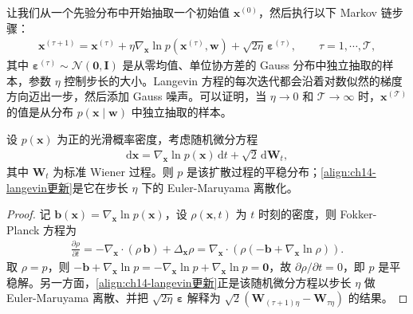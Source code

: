 \documentclass[../../main.tex]{subfiles}
\begin{document}
让我们从一个先验分布中开始抽取一个初始值 $\bm{x}^{(0)}$，然后执行以下 Markov 链步骤：
\begin{align}
\bm{x}^{(\tau+1)}=\bm{x}^{(\tau)}+\eta\nabla_{\bm{x}}\ln p\!\left(\bm{x}^{(\tau)},\bm{w}\right)+\sqrt{2\eta}\,\bm{\varepsilon}^{(\tau)},\qquad \tau=1,\cdots,\mathcal{T},
\label{align:ch14-langevin更新}
\end{align}
其中 $\bm{\varepsilon}^{(\tau)}\sim\mathcal{N}(\bm{0},\bm{I})$ 是从零均值、单位协方差的 Gauss 分布中独立抽取的样本，参数 $\eta$ 控制步长的大小。Langevin 方程的每次迭代都会沿着对数似然的梯度方向迈出一步，然后添加 Gauss 噪声。可以证明，当 $\eta\rightarrow0$ 和 $\mathcal{T}\rightarrow\infty$ 时，$\bm{x}^{(\mathcal{T})}$ 的值是从分布 $p(\bm{x}\mid\bm{w})$ 中独立抽取的样本。

\begin{proposition}\label{proposition:ch14-langevin平稳}
设 $p(\bm{x})$ 为正的光滑概率密度，考虑随机微分方程
\begin{align*}
\mathrm{d}\bm{x}=\nabla_{\bm{x}}\ln p(\bm{x})\,\mathrm{d}t+\sqrt{2}\,\mathrm{d}\bm{W}_{t},
\end{align*}
其中 $\bm{W}_{t}$ 为标准 Wiener 过程。则 $p$ 是该扩散过程的平稳分布；\eqref{align:ch14-langevin更新}是它在步长 $\eta$ 下的 Euler-Maruyama 离散化。
\end{proposition}

\begin{proof}
记 $\bm{b}(\bm{x})=\nabla_{\bm{x}}\ln p(\bm{x})$，设 $\rho(\bm{x},t)$ 为 $t$ 时刻的密度，则 Fokker-Planck 方程为
\begin{align*}
\frac{\partial\rho}{\partial t}=-\nabla_{\bm{x}}\cdot\left(\rho\,\bm{b}\right)+\Delta_{\bm{x}}\rho=\nabla_{\bm{x}}\cdot\left(\rho\left(-\bm{b}+\nabla_{\bm{x}}\ln\rho\right)\right).
\end{align*}
取 $\rho=p$，则 $-\bm{b}+\nabla_{\bm{x}}\ln p=-\nabla_{\bm{x}}\ln p+\nabla_{\bm{x}}\ln p=\bm{0}$，故 $\partial\rho/\partial t=0$，即 $p$ 是平稳解。另一方面，\eqref{align:ch14-langevin更新}正是该随机微分方程以步长 $\eta$ 做 Euler-Maruyama 离散、并把 $\sqrt{2\eta}\,\bm{\varepsilon}$ 解释为 $\sqrt{2}\left(\bm{W}_{(\tau+1)\eta}-\bm{W}_{\tau\eta}\right)$ 的结果。
\end{proof}
\end{document}
